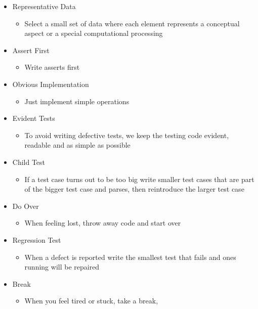 \documentclass[a4, english]{article}
\begin{document}
\begin{itemize}
  \item Representative Data
  \begin{itemize}
    \item Select a small set of data where each element represents a conceptual aspect or a special computational processing
  \end{itemize}
  \item Assert First
  \begin{itemize}
    \item Write asserts first
  \end{itemize}
  \item Obvious Implementation
  \begin{itemize}
    \item Just implement simple operations
  \end{itemize}
  \item Evident Tests
  \begin{itemize}
    \item To avoid writing defective tests, we keep the testing code evident, readable and as simple as possible
  \end{itemize}
  \item Child Test
  \begin{itemize}
  	\item If a test case turns out to be too big write smaller test cases that are part of the bigger test case and parses, then reintroduce the larger test case
  \end{itemize}
  \item Do Over
  \begin{itemize}
  	\item When feeling lost, throw away code and start over
  \end{itemize}
  \item Regression Test 
  \begin{itemize}
  	\item When a defect is reported write the smallest test that fails and ones running will be repaired 
  \end{itemize}
  \item Break
  \begin{itemize}
    \item When you feel tired or stuck, take a break,
  \end{itemize}
\end{itemize}
\end{document}
